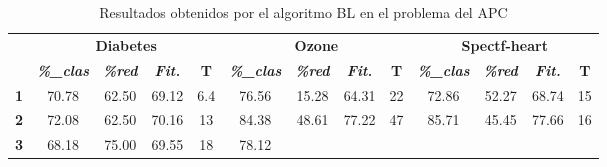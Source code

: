 \begin{table}[H]
	\centering
	\caption{Resultados obtenidos por el algoritmo BL en el problema del APC												
	}
	\label{tab:bl}
	\begin{tabular}{ccccccccccccc}
		\cline{2-13}
		&
		\multicolumn{4}{c}{\cellcolor[HTML]{C0C0C0}\textbf{Diabetes}} &
		\multicolumn{4}{c}{\cellcolor[HTML]{C0C0C0}\textbf{Ozone}} &
		\multicolumn{4}{c}{\cellcolor[HTML]{C0C0C0}\textbf{Spectf-heart}} \\ \cline{2-13} 
		\multirow{-2}{*}{} &
		\cellcolor[HTML]{DAE8FC}\textit{\textbf{\%\_clas}} &
		\cellcolor[HTML]{DAE8FC}\textit{\textbf{\%red}} &
		\cellcolor[HTML]{DAE8FC}\textit{\textbf{Fit.}} &
		\multicolumn{1}{c|}{\cellcolor[HTML]{DAE8FC}\textbf{T}} &
		\cellcolor[HTML]{DAE8FC}\textit{\textbf{\%\_clas}} &
		\cellcolor[HTML]{DAE8FC}\textit{\textbf{\%red}} &
		\cellcolor[HTML]{DAE8FC}\textit{\textbf{Fit.}} &
		\multicolumn{1}{c|}{\cellcolor[HTML]{DAE8FC}\textbf{T}} &
		\cellcolor[HTML]{DAE8FC}\textit{\textbf{\%\_clas}} &
		\cellcolor[HTML]{DAE8FC}\textit{\textbf{\%red}} &
		\cellcolor[HTML]{DAE8FC}\textit{\textbf{Fit.}} &
		\cellcolor[HTML]{DAE8FC}\textbf{T} \\ \cline{2-13} 
		\multicolumn{1}{c|}{\cellcolor[HTML]{C0C0C0}\textbf{1}} &
		\multicolumn{1}{c|}{70.78} &
		\multicolumn{1}{c|}{62.50} &
		\multicolumn{1}{c|}{69.12} &
		\multicolumn{1}{c|}{6.4} &
		\multicolumn{1}{c|}{76.56} &
		\multicolumn{1}{c|}{15.28} &
		\multicolumn{1}{c|}{64.31} &
		\multicolumn{1}{c|}{22} &
		\multicolumn{1}{c|}{72.86} &
		\multicolumn{1}{c|}{52.27} &
		\multicolumn{1}{c|}{68.74} &
		\multicolumn{1}{c|}{15} \\ \cline{2-13} 
		\multicolumn{1}{c|}{\cellcolor[HTML]{C0C0C0}\textbf{2}} &
		\multicolumn{1}{c|}{72.08} &
		\multicolumn{1}{c|}{62.50} &
		\multicolumn{1}{c|}{70.16} &
		\multicolumn{1}{c|}{13} &
		\multicolumn{1}{c|}{84.38} &
		\multicolumn{1}{c|}{48.61} &
		\multicolumn{1}{c|}{77.22} &
		\multicolumn{1}{c|}{47} &
		\multicolumn{1}{c|}{85.71} &
		\multicolumn{1}{c|}{45.45} &
		\multicolumn{1}{c|}{77.66} &
		\multicolumn{1}{c|}{16} \\ \cline{2-13} 
		\multicolumn{1}{c|}{\cellcolor[HTML]{C0C0C0}\textbf{3}} &
		\multicolumn{1}{c|}{68.18} &
		\multicolumn{1}{c|}{75.00} &
		\multicolumn{1}{c|}{69.55} &
		\multicolumn{1}{c|}{18} &
		\multicolumn{1}{c|}{78.12} &

\end{tabular}
\end{table}
